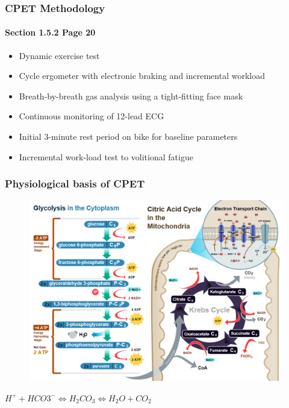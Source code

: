 \documentclass[10pt]{beamer}
\begin{document}
\begin{frame}
	\frametitle{CPET Methodology}
	\framesubtitle{Section 1.5.2 Page 20 }
	\begin{itemize}
		\item Dynamic exercise test
		\item Cycle ergometer with electronic braking and incremental workload
		\item Breath-by-breath gas analysis using a tight-fitting face mask
		\item Continuous monitoring of 12-lead ECG
		\item Initial 3-minute rest period on bike for baseline parameters
		\item Incremental work-load test to volitional fatigue
	\end{itemize}
\end{frame}

\begin{frame}
	\frametitle{Physiological basis of CPET} 
	\begin{figure}
		\centering
		\includegraphics[width=0.5\linewidth]{CellRespiration}
		\label{fig:CellRespiration}
	\end{figure}
	\begin{block}
	\centering
	$H^+ + HCO3^- \Longleftrightarrow H_2CO_3 \Longleftrightarrow H_2O + CO_2$
	\end{block}

\end{frame}
\end{document}
